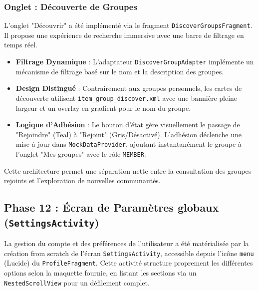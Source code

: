 \documentclass{article}
\begin{document}
\subsubsection{Onglet : Découverte de Groupes}
L'onglet "Découvrir" a été implémenté via le fragment \texttt{DiscoverGroupsFragment}. Il propose une expérience de recherche immersive avec une barre de filtrage en temps réel.
\begin{itemize}
    \item \textbf{Filtrage Dynamique} : L'adaptateur \texttt{DiscoverGroupAdapter} implémente un mécanisme de filtrage basé sur le nom et la description des groupes.
    \item \textbf{Design Distingué} : Contrairement aux groupes personnels, les cartes de découverte utilisent \texttt{item\_group\_discover.xml} avec une bannière pleine largeur et un overlay en gradient pour le nom du groupe.
    \item \textbf{Logique d'Adhésion} : Le bouton d'état gère visuellement le passage de "Rejoindre" (Teal) à "Rejoint" (Gris/Désactivé). L'adhésion déclenche une mise à jour dans \texttt{MockDataProvider}, ajoutant instantanément le groupe à l'onglet "Mes groupes" avec le rôle \texttt{MEMBER}.
\end{itemize}
Cette architecture permet une séparation nette entre la consultation des groupes rejoints et l'exploration de nouvelles communautés.

\subsection{Phase 12 : Écran de Paramètres globaux (\texttt{SettingsActivity})}
La gestion du compte et des préférences de l'utilisateur a été matérialisée par la création from scratch de l'écran \texttt{SettingsActivity}, accessible depuis l'icône \texttt{menu} (Lucide) du \texttt{ProfileFragment}.
Cette activité structure proprement les différentes options selon la maquette fournie, en listant les sections via un \texttt{NestedScrollView} pour un défilement complet.
\end{document}

